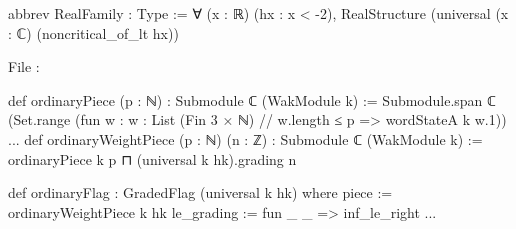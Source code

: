 \begin{leancode}
abbrev RealFamily : Type :=
  ∀ (x : ℝ) (hx : x < -2), RealStructure (universal (x : ℂ) (noncritical_of_lt hx))
\end{leancode}
{\raggedright\noindent File :\par}
\begin{leancode}
def ordinaryPiece (p : ℕ) : Submodule ℂ (WakModule k) :=
  Submodule.span ℂ (Set.range (fun w : {w : List (Fin 3 × ℕ) // w.length ≤ p} =>
    wordStateA k w.1))
...
def ordinaryWeightPiece (p : ℕ) (n : ℤ) : Submodule ℂ (WakModule k) :=
  ordinaryPiece k p ⊓ (universal k hk).grading n

def ordinaryFlag : GradedFlag (universal k hk) where
  piece := ordinaryWeightPiece k hk
  le_grading := fun _ _ => inf_le_right
  ...
\end{leancode}

